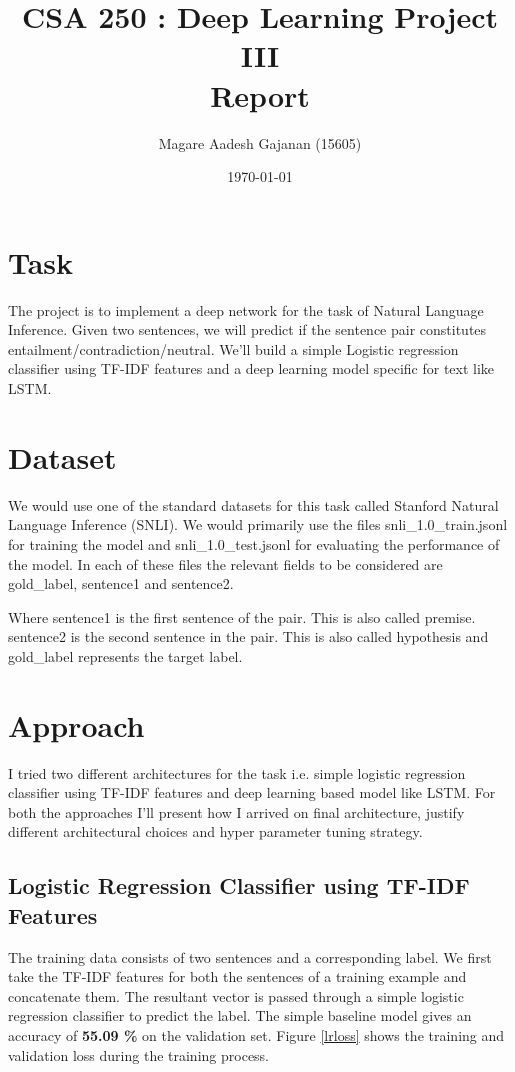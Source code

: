 \documentclass[10pt,a4paper]{article}
\title{CSA 250 : Deep Learning Project III \\ Report}
\author{Magare Aadesh Gajanan (15605)}
\date{\today}
\begin{document}
\maketitle
\section{Task}

The project is to implement a deep network for the task of Natural Language Inference. Given two sentences, we will predict if the sentence pair constitutes entailment/contradiction/neutral. We'll build a simple Logistic regression classifier using TF-IDF features and a deep learning model specific for text like LSTM.


\section{Dataset}
We would use one of the standard datasets for this task called Stanford Natural Language Inference (SNLI). We would primarily use the files snli\_1.0\_train.jsonl for training the model and snli\_1.0\_test.jsonl for evaluating the performance of the model. In each of these files the relevant fields to be considered are gold\_label, sentence1 and sentence2. 

Where sentence1 is the first sentence of the pair. This is also called premise. sentence2 is the second sentence in the pair. This is also called hypothesis and gold\_label represents the target label.


\section{Approach}
I tried two different architectures for the task i.e. simple logistic regression classifier using TF-IDF features and deep learning based model like LSTM. For both the approaches I'll present how I arrived on final architecture, justify different architectural choices and hyper parameter tuning strategy.

\subsection{Logistic Regression Classifier using TF-IDF Features}

The training data consists of two sentences and a corresponding label. We first take the TF-IDF features for both the sentences of a training example and concatenate them. The resultant vector is passed through a simple logistic regression classifier to predict the label. The simple baseline model gives an accuracy of \textbf{55.09 \%} on the validation set. Figure \ref{lrloss} shows the training and validation loss during the training process.
\end{document}
